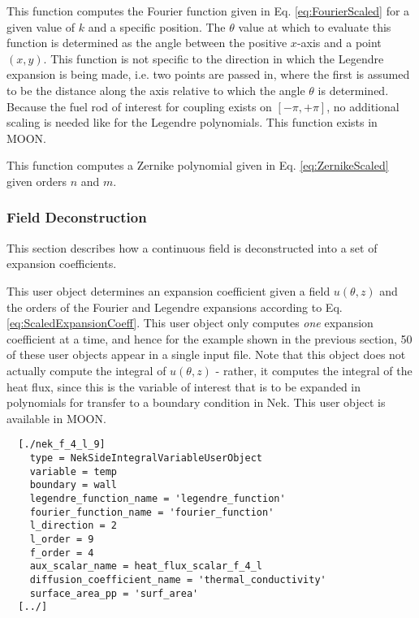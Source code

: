 \documentclass[10pt]{article}
\newcounter{subsubsubsection}[subsubsection]
\numberwithin{equation}{section} %
\begin{document}
This function computes the Fourier function given in Eq. \eqref{eq:FourierScaled} for a given value of \(k\) and a specific position. The \(\theta\) value at which to evaluate this function is determined as the angle between the positive \(x\)-axis and a point \((x,y)\). This function is not specific to the direction in which the Legendre expansion is being made, i.e. two points are passed in, where the first is assumed to be the distance along the axis relative to which the angle \(\theta\) is determined. Because the fuel rod of interest for coupling exists on \([-\pi, +\pi]\), no additional scaling is needed like for the Legendre polynomials. This function exists in MOON.

This function computes a Zernike polynomial given in Eq. \eqref{eq:ZernikeScaled} given orders \(n\) and \(m\). 

\subsubsection{Field Deconstruction}
This section describes how a continuous field is deconstructed into a set of expansion coefficients. 

This user object determines an expansion coefficient given a field \(u(\theta, z)\) and the orders of the Fourier and Legendre expansions according to Eq. \eqref{eq:ScaledExpansionCoeff}. This user object only computes {\it one} expansion coefficient at a time, and hence for the example shown in the previous section, 50 of these user objects appear in a single input file. Note that this object does not actually compute the integral of \(u(\theta, z)\) - rather, it computes the integral of the heat flux, since this is the variable of interest that is to be expanded in polynomials for transfer to a boundary condition in Nek. This user object is available in MOON.

\begin{lstlisting}
  [./nek_f_4_l_9]
    type = NekSideIntegralVariableUserObject
    variable = temp
    boundary = wall
    legendre_function_name = 'legendre_function'
    fourier_function_name = 'fourier_function'
    l_direction = 2
    l_order = 9
    f_order = 4
    aux_scalar_name = heat_flux_scalar_f_4_l
    diffusion_coefficient_name = 'thermal_conductivity'
    surface_area_pp = 'surf_area'
  [../]
\end{lstlisting}
\end{document}
